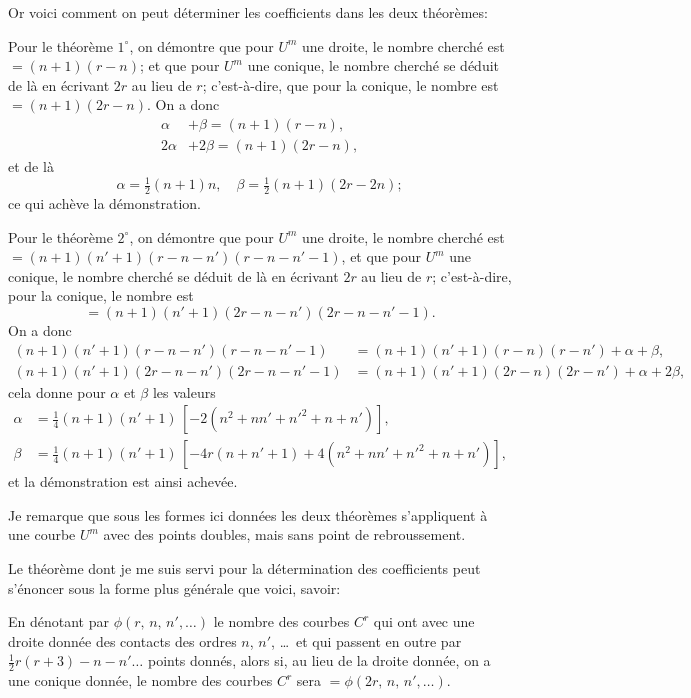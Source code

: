 \documentclass[11pt,a4paper]{article}
\theoremstyle{plain}
\theoremstyle{definition}
\begin{document}
Or voici comment on peut d\'eterminer les coefficients dans les deux th\'eor\`emes:

Pour le th\'eor\`eme $1^\circ$, on d\'emontre que pour $U^m$ une droite, le nombre cherch\'e
est $= (n+1)(r-n)$; et que pour $U^m$ une conique, le nombre cherch\'e se d\'eduit de
l\`a en \'ecrivant $2r$ au lieu de $r$; c'est-\`a-dire, que pour la conique, le nombre est
$= (n+1)(2r-n)$.  On a donc
\begin{align*}
\alpha &+ \beta = (n+1)(r-n), \\
2\alpha &+ 2\beta = (n+1)(2r-n),
\end{align*}
et de l\`a
\[
\alpha = \tfrac{1}{2}(n+1)n, \quad \beta = \tfrac{1}{2}(n+1)(2r-2n);
\]
ce qui ach\`eve la d\'emonstration.

Pour le th\'eor\`eme $2^\circ$, on d\'emontre que pour $U^m$ une droite, le nombre cherch\'e
est $= (n+1)(n'+1)(r-n-n')(r-n-n'-1)$, et que pour $U^m$ une conique, le nombre
cherch\'e se d\'eduit de l\`a en \'ecrivant $2r$ au lieu de $r$; c'est-\`a-dire, pour la conique,
le nombre est
\[
= (n+1)(n'+1)(2r-n-n')(2r-n-n'-1).
\]
On a donc
\begin{align*}
(n+1)(n'+1)(r-n-n')(r-n-n'-1) &= (n+1)(n'+1)(r-n)(r-n') + \alpha + \beta, \\
(n+1)(n'+1)(2r-n-n')(2r-n-n'-1) &= (n+1)(n'+1)(2r-n)(2r-n') + \alpha + 2\beta,
\end{align*}
cela donne pour $\alpha$ et $\beta$ les valeurs
\begin{align*}
\alpha &= \tfrac{1}{4}(n+1)(n'+1)\,[-2(n^2 + nn' + n'^2 + n + n')], \\
\beta  &= \tfrac{1}{4}(n+1)(n'+1)\,[-4r(n + n' + 1) + 4(n^2 + nn' + n'^2 + n + n')],
\end{align*}
et la d\'emonstration est ainsi achev\'ee.

\clearpage

Je remarque que sous les formes ici donn\'ees les deux th\'eor\`emes s'appliquent \`a
une courbe $U^m$ avec des points doubles, mais sans point de rebroussement.

Le th\'eor\`eme dont je me suis servi pour la d\'etermination des coefficients peut
s'\'enoncer sous la forme plus g\'en\'erale que voici, savoir:

En d\'enotant par $\phi(r,\,n,\,n',\dots)$ le nombre des courbes $C^r$ qui ont avec une droite
donn\'ee des contacts des ordres $n$, $n'$, \dots\ et qui passent en outre par $\tfrac{1}{2}r(r+3) - n - n'\dots$
points donn\'es, alors si, au lieu de la droite donn\'ee, on a une conique donn\'ee, le
nombre des courbes $C^r$ sera $= \phi(2r,\,n,\,n',\dots)$.
\end{document}
